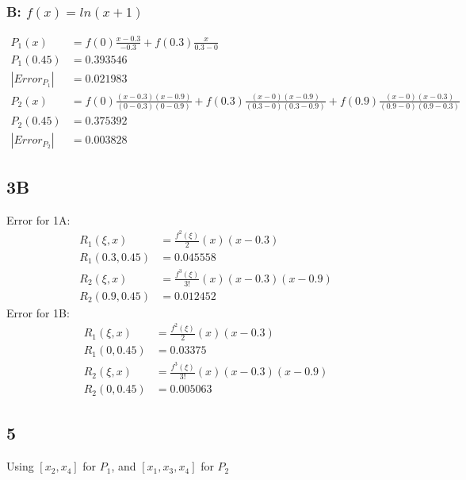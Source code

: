\documentclass{oisinclass}
\begin{document}
\subsubsection*{B: \(f(x) = ln(x+1)\)}
\begin{align*}
	P_1(x)                   & = f(0)\frac{x-0.3}{-0.3} + f(0.3)\frac{x}{0.3-0}                                                                                        \\
	P_1(0.45)                & = 0.393546                                                                                                                              \\
	\left|Error_{P_1}\right| & = 0.021983                                                                                                                              \\
	P_2(x)                   & = f(0)\frac{(x-0.3)(x-0.9)}{(0-0.3)(0-0.9)} + f(0.3)\frac{(x-0)(x-0.9)}{(0.3-0)(0.3-0.9)} + f(0.9)\frac{(x-0)(x-0.3)}{(0.9-0)(0.9-0.3)} \\
	P_2(0.45)                & = 0.375392                                                                                                                              \\
	\left|Error_{P_2}\right| & = 0.003828
\end{align*}

\subsection*{3B}
Error for 1A:
\begin{align*}
	R_1(\xi, x)    & = \frac{f^2(\xi)}{2}(x)(x-0.3)         \\
	R_1(0.3, 0.45) & = 0.045558                             \\
	R_2(\xi, x)    & = \frac{f^3(\xi)}{3!}(x)(x-0.3)(x-0.9) \\
	R_2(0.9, 0.45) & = 0.012452
\end{align*}
Error for 1B:
\begin{align*}
	R_1(\xi, x)  & = \frac{f^2(\xi)}{2}(x)(x-0.3)         \\
	R_1(0, 0.45) & = 0.03375                              \\
	R_2(\xi, x)  & = \frac{f^3(\xi)}{3!}(x)(x-0.3)(x-0.9) \\
	R_2(0, 0.45) & = 0.005063
\end{align*}
\newpage
\subsection*{5}
Using \([x_2, x_4]\) for \(P_1\), and \([x_1, x_3, x_4]\) for \(P_2\)
\end{document}
